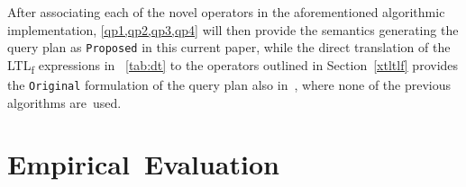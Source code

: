 \documentclass[information,article,accept,pdftex,oneauthor]{Definitions/mdpi}
\begin{document}
After associating each of the novel operators in the aforementioned algorithmic implementation,  \cref{qp1,qp2,qp3,qp4} will then provide the semantics generating the query plan as \texttt{Proposed} in this current paper, while the direct translation of the LTL\textsubscript{f} expressions in \tablename~\ref{tab:dt} to the operators outlined in Section~\ref{xtltlf} provides the \texttt{Original} formulation of the query plan also in~\cite{info14030173}, where none of the previous algorithms are~used.





\section{Empirical~Evaluation}\label{sec:empeval}
\end{document}
